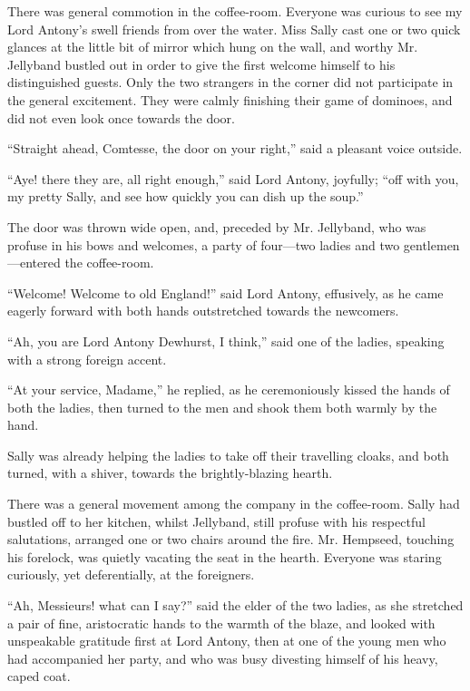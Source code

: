 \documentclass[paper=a5,BCOR=7mm,twoside,DIV=calc,12pt,usegeometry,chapterprefix,endperiod,headings=big]{scrbook}
\begin{document}
There was general commotion in the coffee-room. Everyone was curious to see my Lord Antony's swell friends from over the water. Miss Sally cast one or two quick glances at the little bit of mirror which hung on the wall, and worthy Mr. Jellyband bustled out in order to give the first welcome himself to his distinguished guests. Only the two strangers in the corner did not participate in the general excitement. They were calmly finishing their game of dominoes, and did not even look once towards the door.

\enquote{Straight ahead, Comtesse, the door on your right,} said a pleasant voice outside.

\enquote{Aye! there they are, all right enough,} said Lord Antony, joyfully; \enquote{off with you, my pretty Sally, and see how quickly you can dish up the soup.}

The door was thrown wide open, and, preceded by Mr. Jellyband, who was profuse in his bows and welcomes, a party of four---two ladies and two gentlemen---entered the coffee-room.

\enquote{Welcome! Welcome to old England!} said Lord Antony, effusively, as he came eagerly forward with both hands outstretched towards the newcomers.

\enquote{Ah, you are Lord Antony Dewhurst, I think,} said one of the ladies, speaking with a strong foreign accent.

\enquote{At your service, Madame,} he replied, as he ceremoniously kissed the hands of both the ladies, then turned to the men and shook them both warmly by the hand.

Sally was already helping the ladies to take off their travelling cloaks, and both turned, with a shiver, towards the brightly-blazing hearth.

There was a general movement among the company in the coffee-room. Sally had bustled off to her kitchen, whilst Jellyband, still profuse with his respectful salutations, arranged one or two chairs around the fire. Mr. Hempseed, touching his forelock, was quietly vacating the seat in the hearth. Everyone was staring curiously, yet deferentially, at the foreigners.

\enquote{Ah, Messieurs! what can I say?} said the elder of the two ladies, as she stretched a pair of fine, aristocratic hands to the warmth of the blaze, and looked with unspeakable gratitude first at Lord Antony, then at one of the young men who had accompanied her party, and who was busy divesting himself of his heavy, caped coat.
\end{document}
